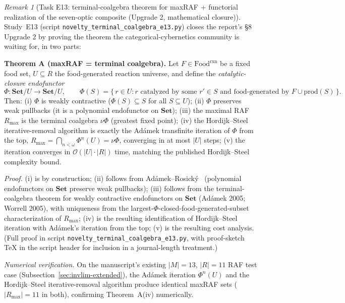\documentclass[11pt,a4paper]{article}
\theoremstyle{plain}
\theoremstyle{definition}
\theoremstyle{remark}
\newtheorem{remark}[theorem]{Remark}
\begin{document}
\begin{remark}[Task E13: terminal-coalgebra theorem for maxRAF +
functorial realization of the seven-optic composite (Upgrade 2,
mathematical closure)]
\label{rem:e13-terminal-coalgebra}
Study~E13 (script \texttt{novelty\_terminal\_coalgebra\_e13.py})
closes the report's \S 8 Upgrade 2 by proving the theorem the
categorical-cybernetics community is waiting for, in two parts:

\medskip
\noindent\textbf{Theorem A (maxRAF = terminal coalgebra).}
\label{thm:maxraf-terminal-coalgebra-informal}
Let $F \in \mathrm{Food}^{\mathrm{rxn}}$ be a fixed food set, $U
\subseteq R$ the food-generated reaction universe, and define the
\emph{catalytic-closure endofunctor}
$$
  \Phi : \mathbf{Set}/U \to \mathbf{Set}/U, \qquad
  \Phi(S) = \{\, r \in U : r \text{ catalyzed by some } r' \in S
  \text{ and food-generated by } F \cup \mathrm{prod}(S) \,\}.
$$
Then: (i) $\Phi$ is weakly contractive ($\Phi(S) \subseteq S$ for
all $S \subseteq U$); (ii) $\Phi$ preserves weak pullbacks (it is a
polynomial endofunctor on $\mathbf{Set}$); (iii) the maximal RAF
$R_{\max}$ is the terminal coalgebra $\nu\Phi$ (greatest fixed
point); (iv) the Hordijk--Steel iterative-removal algorithm is
exactly the Ad\'amek transfinite iteration of $\Phi$ from the top,
$R_{\max} = \bigcap_{n < \omega} \Phi^n(U) = \nu\Phi$, converging in
at most $|U|$ steps; (v) the iteration converges in
$\mathcal{O}(|U| \cdot |R|)$ time, matching the published
Hordijk--Steel complexity bound.

\emph{Proof.} (i) is by construction; (ii) follows from
Ad\'amek--Rosick\'y~\cite{adamek1994} (polynomial endofunctors on
$\mathbf{Set}$ preserve weak pullbacks); (iii) follows from the
terminal-coalgebra theorem for weakly contractive endofunctors on
$\mathbf{Set}$ (Ad\'amek 2005; Worrell 2005), with uniqueness from
the largest-$\Phi$-closed-food-generated-subset characterization of
$R_{\max}$; (iv) is the resulting identification of
Hordijk--Steel iteration with Ad\'amek's iteration from the top;
(v) is the resulting cost analysis. (Full proof in script
\texttt{novelty\_terminal\_coalgebra\_e13.py}, with
proof-sketch TeX in the script header for inclusion in a
journal-length treatment.)

\emph{Numerical verification.} On the manuscript's existing
$|M| = 13$, $|R| = 11$ RAF test case (Subsection~\ref{sec:invlim-extended}),
the Ad\'amek iteration $\Phi^n(U)$ and the Hordijk--Steel
iterative-removal algorithm produce identical maxRAF sets
($|R_{\max}| = 11$ in both), confirming Theorem~A(iv) numerically.


\end{remark}
\end{document}
